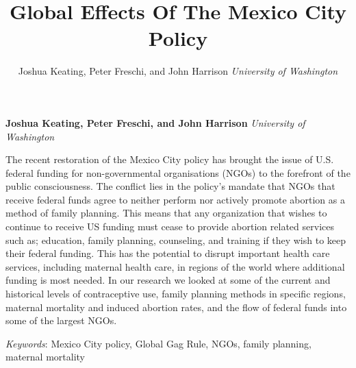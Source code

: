 \documentclass[11pt,]{article}
\title{Global Effects Of The Mexico City Policy  }
\author{\Large Joshua Keating, Peter Freschi, and John Harrison\vspace{0.05in} \newline\normalsize\emph{University of Washington}  }
\date{}
\newcommand*{\authorfont}{\fontfamily{phv}\selectfont}
\renewenvironment{abstract}
 {{%
    \setlength{\leftmargin}{0mm}
    \setlength{\rightmargin}{\leftmargin}%
  }%
  \relax}
 {\endlist}
\begin{document}
	
%

{%
\setlength{\parindent}{0pt}
\thispagestyle{plain}
{\fontsize{18}{20}\selectfont\raggedright 
\maketitle  %

}

{
   \vskip 13.5pt\relax \normalsize\fontsize{11}{12} 
\textbf{\authorfont Joshua Keating, Peter Freschi, and John Harrison} \hskip 15pt \emph{\small University of Washington}   

}

}







\begin{abstract}

    \hbox{\vrule height .2pt width 39.14pc}

    \vskip 8.5pt %

\noindent The recent restoration of the Mexico City policy has brought the issue
of U.S. federal funding for non-governmental organisations (NGOs) to the
forefront of the public consciousness. The conflict lies in the policy's
mandate that NGOs that receive federal funds agree to neither perform
nor actively promote abortion as a method of family planning. This means
that any organization that wishes to continue to receive US funding must
cease to provide abortion related services such as; education, family
planning, counseling, and training if they wish to keep their federal
funding. This has the potential to disrupt important health care
services, including maternal health care, in regions of the world where
additional funding is most needed. In our research we looked at some of
the current and historical levels of contraceptive use, family planning
methods in specific regions, maternal mortality and induced abortion
rates, and the flow of federal funds into some of the largest NGOs.


\vskip 8.5pt \noindent \emph{Keywords}: Mexico City policy, Global Gag Rule, NGOs, family planning, maternal
mortality \par

    \hbox{\vrule height .2pt width 39.14pc}



\end{abstract}
\end{document}
